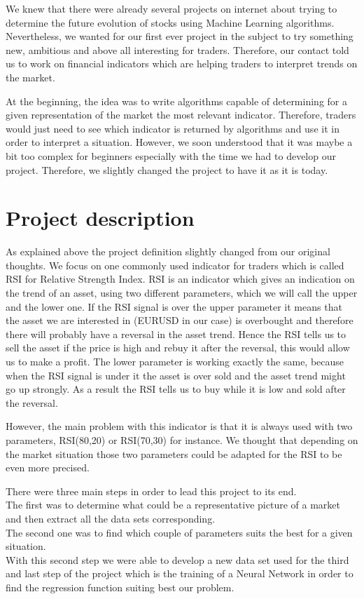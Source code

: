 \documentclass[]{article}
\begin{document}
\vskip 0.3cm
We knew that there were already several projects on internet about trying to determine the future evolution of stocks using Machine Learning algorithms. Nevertheless, we wanted for our first ever project in the subject to try something new, ambitious and above all interesting for traders. Therefore, our contact told us to work on financial indicators which are helping traders to interpret trends on the market.

\vskip 0.3cm 
At the beginning, the idea was to write algorithms capable of determining for a given representation of the market the most relevant indicator. Therefore, traders would just need to see which indicator is returned by algorithms and use it in order to interpret a situation. However, we soon understood that it was maybe a bit too complex for beginners especially with the time we had to develop our project.
Therefore, we slightly changed the project to have it as it is today.

\section{Project description}

\vskip 0.3cm
As explained above the project definition slightly changed from our original thoughts. We focus on one commonly used indicator for traders which is called RSI for Relative Strength Index. RSI is an indicator which gives an indication on the trend of an asset, using two different parameters, which we will call the upper and the lower one. If the RSI signal is over the upper parameter it means that the asset we are interested in (EURUSD in our case) is overbought and therefore there will probably have a reversal in the asset trend. Hence the RSI tells us to sell the asset if the price is high and rebuy it after the reversal, this would allow us to make a profit. The lower parameter is working exactly the same, because when the RSI signal is under it the asset is over sold and the asset trend might go up strongly. As a result the RSI tells us to buy while it is low and sold after the reversal.

\vskip 0.3cm
However, the main problem with this indicator is that it is always used with two parameters, RSI(80,20) or RSI(70,30) for instance. We thought that depending on the market situation those two parameters could be adapted  for the RSI to be even more precised. 

\vskip 0.3cm
There were three main steps in order to lead this project to its end.\\
The first was to determine what could be a representative picture of a market and then extract all the data sets corresponding.\\
The second one was to find which couple of parameters suits the best for a given situation.\\
With this second step we were able to develop a new data set used for the third and last step of the project which is the training of a Neural Network in order to find the regression function suiting best our problem.  
\end{document}
